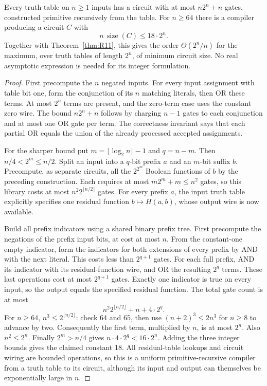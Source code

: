 \begin{theorem}
\label{thm:R13}
Every truth table on $n\geq1$ inputs has a circuit with at most
$n2^n+n$ gates, constructed primitive recursively from the table.
For $n\geq64$ there is a compiler producing a circuit $C$ with
\[
 n\,\operatorname{size}(C)\leq18\cdot2^n.
\]
Together with Theorem~\ref{thm:R11}, this gives the order
$\Theta(2^n/n)$ for the maximum, over truth tables of length $2^n$, of
minimum circuit size. No real asymptotic expression is needed for its
integer formulation.
\end{theorem}
\begin{proof}
First precompute the $n$ negated inputs. For every input assignment with
table bit one, form the conjunction of its $n$ matching literals, then
OR these terms. At most $2^n$ terms are present, and the zero-term case
uses the constant zero wire. The bound $n2^n+n$ follows by charging
$n-1$ gates to each conjunction and at most one OR gate per term.
The correctness invariant says that each partial OR equals the union
of the already processed accepted assignments.

For the sharper bound put
$m=\lfloor\log_2 n\rfloor-1$ and $q=n-m$. Then
$n/4<2^m\leq n/2$. Split an input into a $q$-bit prefix $a$ and an
$m$-bit suffix $b$. Precompute, as separate circuits, all the
$2^{2^m}$ Boolean functions of $b$ by the preceding construction. Each
requires at most $m2^m+m\leq n^2$ gates, so this library costs at most
$n^2 2^{\lfloor n/2\rfloor}$ gates. For every prefix $a$, the input
truth table explicitly specifies one residual function $b\mapsto H(a,b)$,
whose output wire is now available.

Build all prefix indicators using a shared binary prefix tree. First
precompute the negations of the prefix input bits, at cost at most $n$.
From the constant-one empty indicator, form the indicators for both
extensions of every prefix by AND with the next literal. This costs
less than $2^{q+1}$ gates. For each full prefix, AND its indicator with
its residual-function wire, and OR the resulting $2^q$ terms. These last
operations cost at most $2^{q+1}$ gates. Exactly one indicator is true
on every input, so the output equals the specified residual function.
The total gate count is at most
\[
 n^2 2^{\lfloor n/2\rfloor}+n+4\cdot2^q.
\]
For $n\geq64$, $n^3\leq2^{\lfloor n/2\rfloor}$: check $64$ and $65$,
then use $(n+2)^3\leq2n^3$ for $n\geq8$ to advance by two.
Consequently the first term, multiplied by $n$, is at most $2^n$.
Also $n^2\leq2^n$. Finally $2^m>n/4$ gives
$n\cdot4\cdot2^q<16\cdot2^n$. Adding the three integer bounds gives
the claimed constant 18. All residual-table lookups and circuit wiring
are bounded operations, so this is a uniform primitive-recursive
compiler from a truth table to its circuit, although its input and output
can themselves be exponentially large in $n$.
\end{proof}

